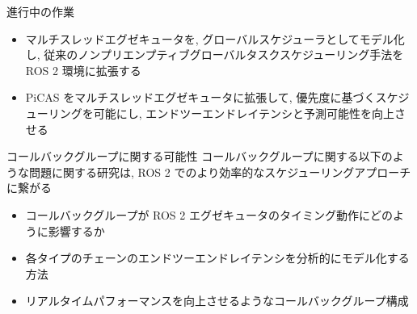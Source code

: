 \begin{frame}{進行中の作業}
    \begin{itemize}
        \item マルチスレッドエグゼキュータを, グローバルスケジューラとしてモデル化し, 従来のノンプリエンプティブグローバルタスクスケジューリング手法を ROS 2 環境に拡張する
        \item PiCAS をマルチスレッドエグゼキュータに拡張して, 優先度に基づくスケジューリングを可能にし, エンドツーエンドレイテンシと予測可能性を向上させる
    \end{itemize}
\end{frame}

\begin{frame}{コールバックグループに関する可能性}
    コールバックグループに関する以下のような問題に関する研究は, ROS 2 でのより効率的なスケジューリングアプローチに繋がる
    \begin{itemize}
        \item コールバックグループが ROS 2 エグゼキュータのタイミング動作にどのように影響するか
        \item 各タイプのチェーンのエンドツーエンドレイテンシを分析的にモデル化する方法
        \item リアルタイムパフォーマンスを向上させるようなコールバックグループ構成
    \end{itemize}
\end{frame}
